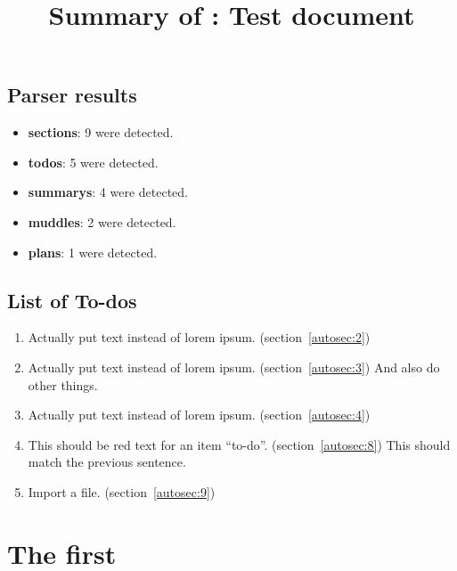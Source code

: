 \title{Summary of : Test document}
\maketitle

\section{Parser results}
    \begin{itemize}[noitemsep]
\item \textbf{sections}: 9 were detected.
\item \textbf{todos}: 5 were detected.
\item \textbf{summarys}: 4 were detected.
\item \textbf{muddles}: 2 were detected.
\item \textbf{plans}: 1 were detected.
    \end{itemize}

\section{List of To-dos}
    \begin{enumerate}[noitemsep]
        \item {\color{red}Actually put text instead of lorem ipsum.} (section~\ref{autosec:2})
        \item {\color{red}Actually put text instead of lorem ipsum.} (section~\ref{autosec:3})
{\color{red}And also do other things.}
        \item {\color{red}Actually put text instead of lorem ipsum.} (section~\ref{autosec:4})
        \item {\color{red}This should be red text for an item ``to-do''.} (section~\ref{autosec:8})
{\color{red}This should match the previous sentence.}
        \item {\color{red}Import a file.} (section~\ref{autosec:9})
    \end{enumerate}

\chapter{The first}
\label{autosec:0}
\vspace{-36pt}\hspace{11pt}
